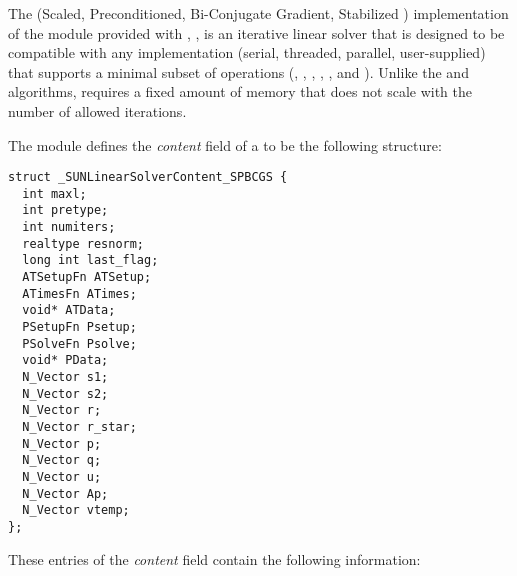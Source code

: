 
The {\spbcg} (Scaled, Preconditioned, Bi-Conjugate Gradient,
Stabilized \cite{Van:92}) implementation of the {\sunlinsol} module 
provided with {\sundials}, {\sunlinsolspbcgs}, is an iterative linear
solver that is designed to be compatible with any {\nvector}
implementation (serial, threaded, parallel, user-supplied) that
supports a minimal subset of operations (, 
, , , ,
 and ).  Unlike the {\spgmr} and {\spfgmr}
algorithms, {\spbcg} requires a fixed amount of memory that does not
scale with the number of allowed iterations.

The {\sunlinsolspbcgs} module defines the {\em content} field of a
 to be the following structure:
\begin{verbatim} 
struct _SUNLinearSolverContent_SPBCGS {
  int maxl;
  int pretype;
  int numiters;
  realtype resnorm;
  long int last_flag;
  ATSetupFn ATSetup;
  ATimesFn ATimes;
  void* ATData;
  PSetupFn Psetup;
  PSolveFn Psolve;
  void* PData;
  N_Vector s1;
  N_Vector s2;
  N_Vector r;
  N_Vector r_star;
  N_Vector p;
  N_Vector q;
  N_Vector u;
  N_Vector Ap;
  N_Vector vtemp;
};
\end{verbatim}
These entries of the \emph{content} field contain the following
information:
